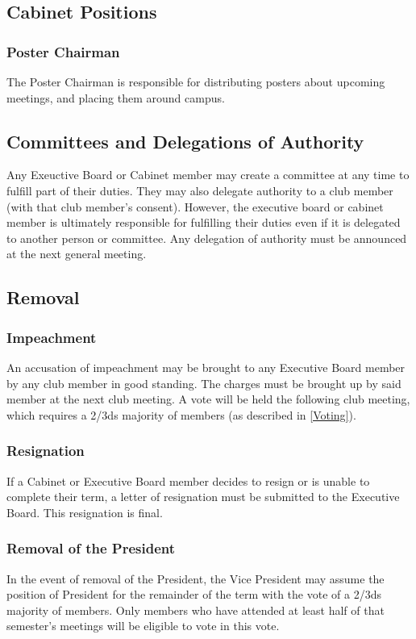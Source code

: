 \documentclass{article}
\begin{document}
\subsection{Cabinet Positions}
\subsubsection{Poster Chairman}
The Poster Chairman is responsible for distributing posters about upcoming meetings, and placing them around campus.
\subsection{Committees and Delegations of Authority}
Any Exeuctive Board or Cabinet member may create a committee at any time to fulfill part of their duties.  They may also delegate authority to a club member (with that club member's consent).  However, the executive board or cabinet member is ultimately responsible for fulfilling their duties even if it is delegated to another person or committee.  Any delegation of authority must be announced at the next general meeting.
\subsection{Removal}
\subsubsection{Impeachment}
An accusation of impeachment may be brought to any Executive Board member by any club member in good standing.  The charges must be brought up by said member at the next club meeting.  A vote will be held the following club meeting, which requires a 2/3ds majority of members (as described in \ref{Voting}).
\subsubsection{Resignation}
If a Cabinet or Executive Board member decides to resign or is unable to complete their term, a letter of resignation must be submitted to the Executive Board.  This resignation is final.
\subsubsection{Removal of the President}
In the event of removal of the President, the Vice President may assume the position of President for the remainder of the term with the vote of a 2/3ds majority of members.  Only members who have attended at least half of that semester's meetings will be eligible to vote in this vote.
\end{document}
